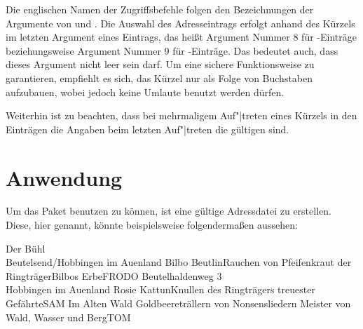 \begin{Declaration}
\end{Declaration}%
Die englischen Namen der Zugriffsbefehle folgen den Bezeichnungen der
Argumente von  und
.  Die Auswahl des Adresseintrags erfolgt
anhand des Kürzels im letzten Argument eines Eintrags, das heißt Argument
Nummer 8 für -Einträge beziehungsweise
Argument Nummer 9 für -Einträge. Das
bedeutet auch, dass dieses Argument nicht leer sein darf.  Um eine sichere
Funktionsweise zu garantieren, empfiehlt es sich, das Kürzel nur als Folge von
Buchstaben aufzubauen, wobei jedoch keine Umlaute benutzt werden dürfen.

Weiterhin ist zu beachten, dass bei mehrmaligem Auf"|treten
eines Kürzels in den Einträgen die Angaben beim
letzten Auf"|treten die gültigen sind.%
%
\EndIndexGroup


\section{Anwendung}

\BeginIndexGroup
{}%
%
Um das Paket benutzen zu können, ist eine gültige
Adressdatei zu erstellen.
Diese, hier  genannt, könnte beispielsweise
folgendermaßen aussehen:
\begin{lstcode}
            {Der Bühl\\ Beutelsend/Hobbingen im Auenland}{}%
            {Bilbo Beutlin}{Rauchen von Pfeifenkraut}%
            {der Ringträger}{Bilbos Erbe}{FRODO}
           {Beutelhaldenweg 3\\Hobbingen im Auenland}{}%
           {Rosie Kattun}{Knullen}%
           {des Ringträgers treuester Gefährte}{SAM}
           {Im Alten Wald}{}%
           {Goldbeere}{trällern von Nonsensliedern}%
           {Meister von Wald, Wasser und Berg}{TOM}
\end{lstcode}

